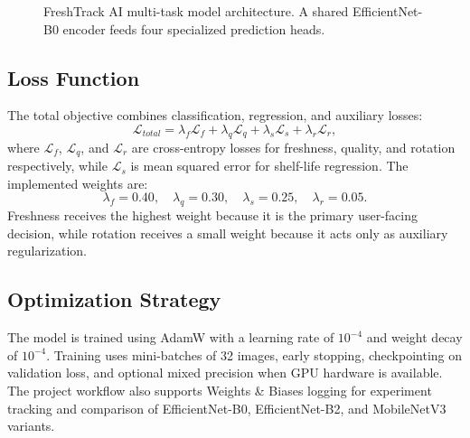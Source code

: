 \documentclass[conference]{IEEEtran}
\begin{document}
\begin{figure}[t]
\centering
{}
\caption{FreshTrack AI multi-task model architecture. A shared EfficientNet-B0 encoder feeds four specialized prediction heads.}
\label{fig:model_architecture}
\end{figure}

\subsection{Loss Function}
The total objective combines classification, regression, and auxiliary losses:
\begin{equation}
\mathcal{L}_{total}=\lambda_f\mathcal{L}_f+\lambda_q\mathcal{L}_q+\lambda_s\mathcal{L}_s+\lambda_r\mathcal{L}_r,
\end{equation}
where $\mathcal{L}_f$, $\mathcal{L}_q$, and $\mathcal{L}_r$ are cross-entropy losses for freshness, quality, and rotation respectively, while $\mathcal{L}_s$ is mean squared error for shelf-life regression. The implemented weights are:
\begin{equation}
\lambda_f=0.40,\quad \lambda_q=0.30,\quad \lambda_s=0.25,\quad \lambda_r=0.05.
\end{equation}
Freshness receives the highest weight because it is the primary user-facing decision, while rotation receives a small weight because it acts only as auxiliary regularization.

\subsection{Optimization Strategy}
The model is trained using AdamW with a learning rate of $10^{-4}$ and weight decay of $10^{-4}$. Training uses mini-batches of 32 images, early stopping, checkpointing on validation loss, and optional mixed precision when GPU hardware is available. The project workflow also supports Weights \& Biases logging for experiment tracking and comparison of EfficientNet-B0, EfficientNet-B2, and MobileNetV3 variants.
\end{document}
